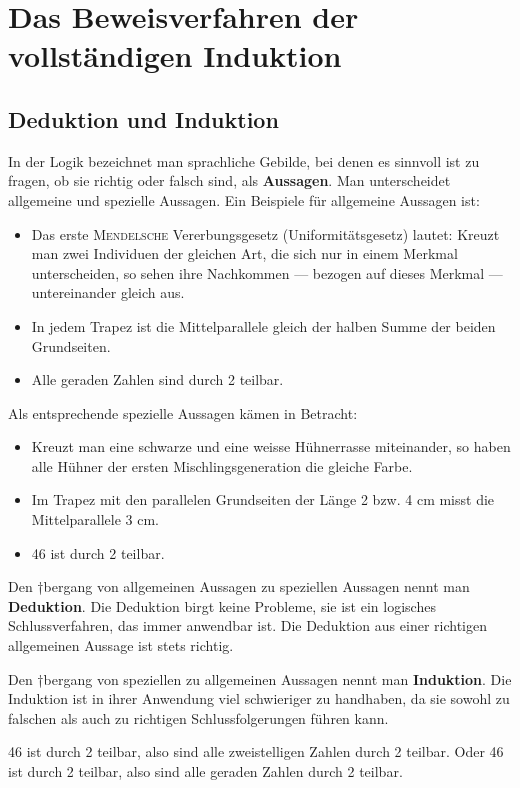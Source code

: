 \documentclass[%
11pt,%
twoside,%
titlepage,%
german,%
headsepline%
]{scrartcl}
\begin{document}
\newpage

\appendix

\section{Das Beweisverfahren der vollst\"andigen Induktion}
\subsection{Deduktion und Induktion}
In der Logik bezeichnet man sprachliche Gebilde, bei denen es sinnvoll ist zu fragen, ob sie richtig oder falsch sind, als \textbf{Aussagen}. Man unterscheidet allgemeine und spezielle Aussagen.
Ein Beispiele f\"ur allgemeine Aussagen ist:
\begin{itemize}
\item Das erste \textsc{Mendelsche} Vererbungsgesetz (Uniformit\"atsgesetz) lautet: Kreuzt man zwei Individuen der gleichen Art, die sich nur in einem Merkmal unterscheiden, so sehen ihre Nachkommen --- bezogen auf dieses Merkmal --- untereinander gleich aus.
\item In jedem Trapez ist die Mittelparallele gleich der halben Summe der beiden Grundseiten.
\item Alle geraden Zahlen sind durch 2 teilbar.
\end{itemize}
Als entsprechende spezielle Aussagen k\"amen in Betracht:
\begin{itemize}
\item Kreuzt man eine schwarze und eine weisse H\"uhnerrasse miteinander, so haben alle H\"uhner der ersten Mischlingsgeneration die gleiche Farbe.
\item Im Trapez mit den parallelen Grundseiten der L\"ange 2 bzw. 4 cm misst die Mittelparallele 3 cm.
\item 46 ist durch 2 teilbar.
\end{itemize}

Den †bergang von allgemeinen Aussagen zu speziellen Aussagen nennt man \textbf{Deduktion}. Die Deduktion birgt keine Probleme, sie ist ein logisches Schlussverfahren, das immer anwendbar ist. Die Deduktion aus einer richtigen allgemeinen Aussage ist stets richtig.

Den †bergang von speziellen zu allgemeinen Aussagen nennt man \textbf{Induktion}.
Die Induktion ist in ihrer Anwendung viel schwieriger zu handhaben, da sie sowohl zu falschen als auch zu richtigen Schlussfolgerungen f\"uhren kann.

\begin{bsp}
46 ist durch 2 teilbar, also sind alle zweistelligen Zahlen durch 2 teilbar. Oder 46 ist durch 2 teilbar, also sind alle geraden Zahlen durch 2 teilbar.
\end{bsp}
\end{document}
